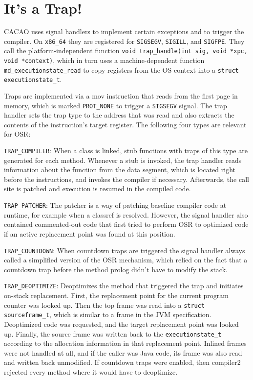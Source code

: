 \documentclass[draft,final]{vutinfth} %
\begin{document}
    \section{It's a Trap!}

    CACAO uses signal handlers to implement certain exceptions and to trigger the compiler.
    On \texttt{x86\_64} they are registered for \lstinline{SIGSEGV}, \lstinline{SIGILL}, and \lstinline{SIGFPE}.
    They call the platform-independent function \lstinline{void trap_handle(int sig, void *xpc, void *context)},
    which in turn uses a machine-dependent function \lstinline{md_executionstate_read} to
    copy registers from the OS context into a \lstinline{struct executionstate_t}.

    Traps are implemented via a mov instruction that reads from the first page in memory,
    which is marked \lstinline{PROT_NONE} to trigger a \lstinline{SIGSEGV} signal.
    The trap handler sets the trap type to the address that was read and also extracts the contents of the instruction's target register.
    The following four types are relevant for OSR:

    \lstinline{TRAP_COMPILER}:
    When a class is linked, stub functions with traps of this type are generated for each method.
    Whenever a stub is invoked, the trap handler reads information about the function from the
    data segment, which is located right before the instructions, and invokes the compiler if necessary.
    Afterwards, the call site is patched and execution is resumed in the compiled code.

    \lstinline{TRAP_PATCHER}:
    The patcher is a way of patching baseline compiler code at runtime, for example when a classref is resolved.
    However, the signal handler also contained commented-out code that first tried to perform OSR to optimized code if an active replacement point was found at this position.

    \lstinline{TRAP_COUNTDOWN}:
    When countdown traps are triggered
    the signal handler always called a simplified version of the OSR mechanism,
    which relied on the fact that a countdown trap before the method prolog didn't have to modify the stack.

    \lstinline{TRAP_DEOPTIMIZE}:
    Deoptimizes the method that triggered the trap and initiates on-stack replacement.
    First, the replacement point for the current program counter was looked up.
    Then the top frame was read into a \lstinline{struct sourceframe_t}, which is similar to a frame in the JVM specification.
    Deoptimized code was requested, and the target replacement point was looked up.
    Finally, the source frame was written back to the \lstinline{executionstate_t} according to the allocation information in that replacement point.
    Inlined frames were not handled at all,
    and if the caller was Java code,
    its frame was also read and written back unmodified.
    If countdown traps were enabled, then compiler2 rejected every method where it would have to deoptimize.
\end{document}
